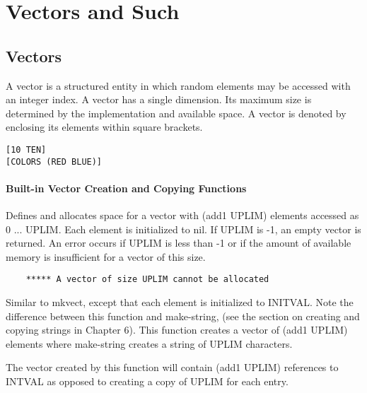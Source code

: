 
\chapter*{Vectors and Such}

\section{Vectors}

  A  vector  is a structured entity in which random elements may
be accessed with an integer  index.    A  vector  has  a  single
dimension.  Its maximum size is determined by the implementation
and  available  space.    A  vector  is denoted by enclosing its
elements within square brackets.
\begin{verbatim}
[10 TEN]
[COLORS (RED BLUE)]
\end{verbatim}


\subsubsection{Built-in Vector Creation and Copying Functions}

{    Defines  and  allocates space for a vector with (add1 UPLIM)
    elements  accessed  as  0  ...  UPLIM.    Each  element   is
    initialized  to  nil.    If  UPLIM is -1, an empty vector is
    returned.  An error occurs if UPLIM is less than  -1  or  if
    the  amount of available memory is insufficient for a vector
    of this size.
}
\begin{verbatim}
    ***** A vector of size UPLIM cannot be allocated
\end{verbatim}

{    Similar to mkvect, except that each element  is  initialized
    to  INITVAL.   Note the difference between this function and
    make-string,  (see  the  section  on  creating  and  copying
    strings  in  Chapter  6).  This function creates a vector of
    (add1 UPLIM) elements where make-string creates a string  of
    UPLIM characters.
}

    The  vector  created  by  this  function  will contain (add1
    UPLIM) references to INTVAL as opposed to creating a copy of
    UPLIM for each entry.

